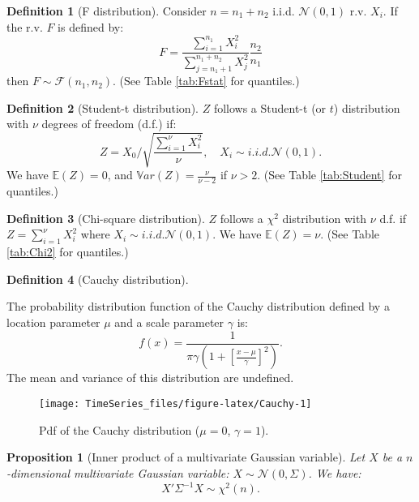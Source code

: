 \documentclass[
  12pt,
]{book}
\newtheorem{proposition}{Proposition}[chapter]
\theoremstyle{definition}
\newtheorem{definition}{Definition}[chapter]
\theoremstyle{definition}
\theoremstyle{definition}
\theoremstyle{definition}
\theoremstyle{remark}
\begin{document}
\begin{definition}[F distribution]
\protect\hypertarget{def:fstatistics}{}\label{def:fstatistics}Consider \(n=n_1+n_2\) i.i.d. \(\mathcal{N}(0,1)\) r.v. \(X_i\). If the r.v. \(F\) is defined by:
\[
F = \frac{\sum_{i=1}^{n_1} X_i^2}{\sum_{j=n_1+1}^{n_1+n_2} X_j^2}\frac{n_2}{n_1}
\]
then \(F \sim \mathcal{F}(n_1,n_2)\). (See Table \ref{tab:Fstat} for quantiles.)
\end{definition}

\begin{definition}[Student-t distribution]
\protect\hypertarget{def:tStudent}{}\label{def:tStudent}\(Z\) follows a Student-t (or \(t\)) distribution with \(\nu\) degrees of freedom (d.f.) if:
\[
Z = X_0 \bigg/ \sqrt{\frac{\sum_{i=1}^{\nu}X_i^2}{\nu}}, \quad X_i \sim i.i.d. \mathcal{N}(0,1).
\]
We have \(\mathbb{E}(Z)=0\), and \(\mathbb{V}ar(Z)=\frac{\nu}{\nu-2}\) if \(\nu>2\). (See Table \ref{tab:Student} for quantiles.)
\end{definition}

\begin{definition}[Chi-square distribution]
\protect\hypertarget{def:chi2}{}\label{def:chi2}\(Z\) follows a \(\chi^2\) distribution with \(\nu\) d.f. if \(Z = \sum_{i=1}^{\nu}X_i^2\) where \(X_i \sim i.i.d. \mathcal{N}(0,1)\).
We have \(\mathbb{E}(Z)=\nu\). (See Table \ref{tab:Chi2} for quantiles.)
\end{definition}

\begin{definition}[Cauchy distribution]
\protect\hypertarget{def:Cauchy}{}\label{def:Cauchy}

The probability distribution function of the Cauchy distribution defined by a location parameter \(\mu\) and a scale parameter \(\gamma\) is:
\[
f(x) = \frac{1}{\pi \gamma \left(1 + \left[\frac{x-\mu}{\gamma}\right]^2\right)}.
\]
The mean and variance of this distribution are undefined.

\begin{figure}
\texttt{[image: TimeSeries\_files/figure-latex/Cauchy-1]} \caption{Pdf of the Cauchy distribution ($\mu=0$, $\gamma=1$).}\label{fig:Cauchy}
\end{figure}

\end{definition}

\begin{proposition}[Inner product of a multivariate Gaussian variable]
\protect\hypertarget{prp:waldtypeproduct}{}\label{prp:waldtypeproduct}Let \(X\) be a \(n\)-dimensional multivariate Gaussian variable: \(X \sim \mathcal{N}(0,\Sigma)\). We have:
\[
X' \Sigma^{-1}X \sim \chi^2(n).
\]
\end{proposition}
\end{document}
